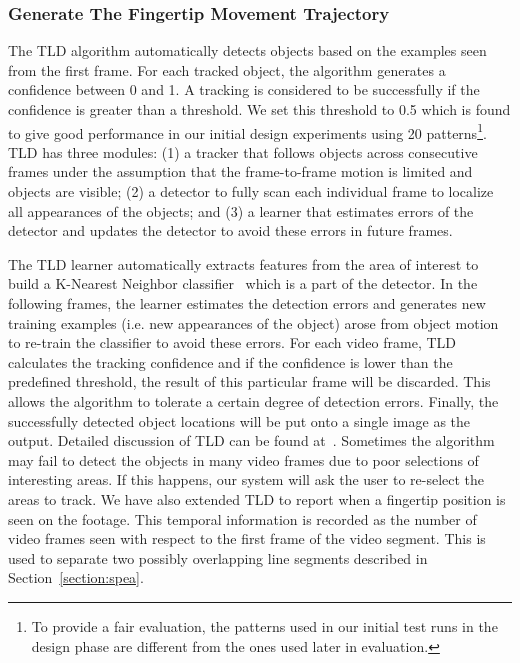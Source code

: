     \subsubsection{Generate The Fingertip Movement Trajectory}

        The TLD algorithm automatically detects
        objects based on the examples seen from the first frame.
        For each tracked object, the algorithm generates a confidence between 0 and 1.
        A tracking is considered to be successfully if the confidence is greater than a threshold.
        We set this threshold to 0.5 which is found to give good performance in our initial design experiments using 20 patterns\footnote{To provide a fair evaluation, the patterns used in
        our initial test runs in the design phase are different from the ones used later in evaluation.}.
        TLD has three modules: (1) a tracker that follows
        objects across consecutive frames under the assumption
        that the frame-to-frame motion is limited and objects are visible;
        (2) a detector to fully scan each individual frame to localize all
        appearances of the objects; and
        (3) a learner that estimates errors of the detector and updates the detector to avoid these errors in future
        frames.


        The TLD learner automatically extracts features from the area of interest to build a K-Nearest Neighbor
        classifier~\cite{hastie1996discriminant}
        which is a part of the detector. In the following frames, the learner
        estimates the detection errors and generates new training
        examples (i.e. new appearances of the object) arose from object motion to
        re-train the classifier to avoid these errors. For each video frame,
        TLD calculates the tracking confidence and if the confidence is lower than the predefined threshold, the result of
        this particular frame will be discarded. This allows the algorithm to
        tolerate a certain degree of detection errors. Finally, the
        successfully detected object locations will be put onto a single
        image as the output. Detailed discussion of TLD can be found
        at~\cite{kalal2012tracking}.
        Sometimes the algorithm may fail to detect the objects in many video frames due to poor selections of interesting areas. If this happens, our system will ask the user to re-select the areas to track.
        We have also extended TLD to report when a
        fingertip position is seen on the footage. This temporal information is recorded as the number
        of video frames seen with respect to the first frame of the video segment.
        This is used to separate two possibly overlapping line segments described in Section~\ref{section:spea}.



